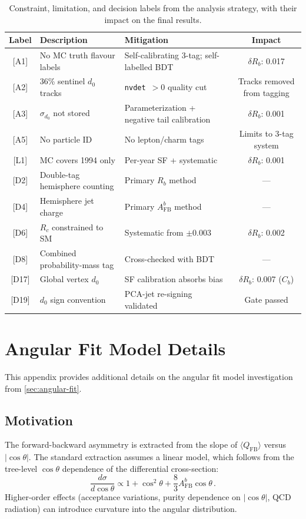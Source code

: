 \documentclass[11pt,a4paper]{article}
\begin{document}
\begin{table}[htbp]
\centering
\caption{Constraint, limitation, and decision labels from the analysis
  strategy, with their impact on the final results.}
\label{tbl:limitation-index}
\begin{tabular}{cp{5cm}p{5cm}c}
\toprule
Label & Description & Mitigation & Impact \\
\midrule
{[A1]} & No MC truth flavour labels & Self-calibrating 3-tag; self-labelled BDT & $\delta R_b$: 0.017 \\
{[A2]} & 36\% sentinel $d_0$ tracks & \texttt{nvdet}~$>0$ quality cut & Tracks removed from tagging \\
{[A3]} & $\sigma_{d_0}$ not stored & Parameterization + negative tail calibration & $\delta R_b$: 0.001 \\
{[A5]} & No particle ID & No lepton/charm tags & Limits to 3-tag system \\
{[L1]} & MC covers 1994 only & Per-year SF + systematic & $\delta R_b$: 0.001 \\
{[D2]} & Double-tag hemisphere counting & Primary $R_b$ method & --- \\
{[D4]} & Hemisphere jet charge & Primary $A_\mathrm{FB}^b$ method & --- \\
{[D6]} & $R_c$ constrained to SM & Systematic from $\pm$0.003 & $\delta R_b$: 0.002 \\
{[D8]} & Combined probability-mass tag & Cross-checked with BDT & --- \\
{[D17]} & Global vertex $d_0$ & SF calibration absorbs bias & $\delta R_b$: 0.007 ($C_b$) \\
{[D19]} & $d_0$ sign convention & PCA-jet re-signing validated & Gate passed \\
\bottomrule
\end{tabular}
\end{table}

\section{Angular Fit Model Details}
\label{app:angular-fit}

This appendix provides additional details on the angular fit model
investigation from \cref{sec:angular-fit}.

\subsection{Motivation}

The forward-backward asymmetry is extracted from the slope of
$\langle Q_\mathrm{FB} \rangle$ versus $|\cos\theta|$.  The standard
extraction assumes a linear model, which follows from the tree-level
$\cos\theta$ dependence of the differential cross-section:
\begin{equation}
  \frac{d\sigma}{d\cos\theta} \propto 1 + \cos^2\theta +
    \frac{8}{3} A_\mathrm{FB}^b \cos\theta\,.
\end{equation}
Higher-order effects (acceptance variations, purity dependence on
$|\cos\theta|$, QCD radiation) can introduce curvature into the
angular distribution.
\end{document}
